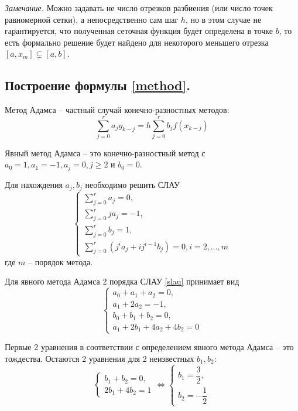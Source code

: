 \documentclass[a4paper, 12pt]{article}
\begin{document}
	\textit{Замечание.} Можно задавать не число отрезков разбиения (или число точек равномерной сетки), а непосредственно сам шаг $h$, но в этом случае не гарантируется, что полученная сеточная функция будет определена в точке $b$, то есть формально решение будет найдено для некоторого меньшего отрезка ${[a,x_m] \varsubsetneq [a,b]}$.
	
	\subsection{Построение формулы \eqref{method}.}
	
	Метод Адамса -- частный случай конечно-разностных методов:
	\begin{equation}
		\sum\limits_{j=0}^ra_jy_{k-j}=h\sum\limits_{j=0}^rb_jf(x_{k-j})
	\end{equation}

	Явный метод Адамса -- это конечно-разностный метод с $a_0=1,a_1=-1,a_j=0,j\geq2$ и $b_0=0$.
	
	Для нахождения $a_j,b_j$ необходимо решить СЛАУ
	\begin{equation} \label{slau}
		\begin{cases}
			\sum\limits_{j=0}^ra_j=0,\\
			\sum\limits_{j=0}^rja_j=-1,\\
			\sum\limits_{j=0}^rb_j=1,\\
			\sum\limits_{j=0}^r(j^ia_j+ij^{i-1}b_j)=0, i=2,...,m
		\end{cases}
	\end{equation}
	где $m$ -- порядок метода.
	
	Для явного метода Адамса 2 порядка СЛАУ \eqref{slau} принимает вид
	\begin{equation}
		\begin{cases}
		a_0+a_1+a_2=0,\\
		a_1+2a_2=-1,\\
		b_0+b_1+b_2=0,\\
		a_1+2b_1+4a_2+4b_2=0
		\end{cases}
	\end{equation}
	
	Первые 2 уравнения в соответствии с определением явного метода Адамса -- это тождества. Остаются 2 уравнения для 2 неизвестных $b_1,b_2$:
	\begin{equation}
		\begin{cases}
		b_1+b_2=0,\\
		2b_1+4b_2=1
		\end{cases}
		\Leftrightarrow
		\begin{cases}
			b_1=\dfrac{3}{2},\\
			b_2=-\dfrac{1}{2}
		\end{cases}
	\end{equation}
\end{document}
